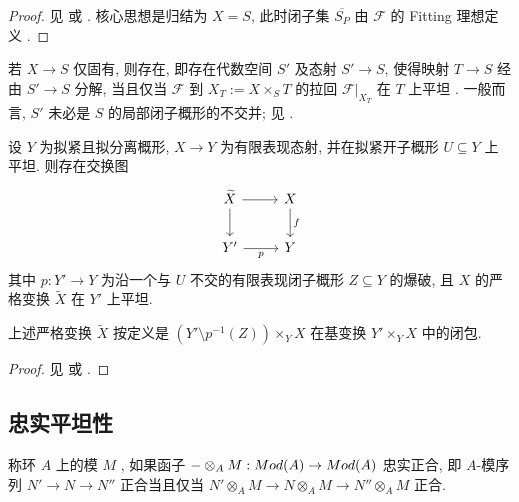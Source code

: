 \begin{proof}
见 \cite[引理 $3.3$]{FGAIV} 或 \cite[\S$8$]{Mum66a}. 核心思想是归结为 $X=S$, 此时闭子集 $\overline{S_P}$ 由 $\mathcal F$ 的 Fitting 理想定义 \cite[Tag 05P9]{SP}.
\end{proof}
\begin{remark}\label{src:A.2.17}
若 $X\to S$ 仅固有, 则存在, 即存在代数空间 $S'$ 及态射 $S'\to S$, 使得映射 $T\to S$ 经由 $S'\to S$ 分解, 当且仅当 $\mathcal F$ 到 $X_T:=X\times_S T$ 的拉回 $\mathcal F|_{X_T}$ 在 $T$ 上平坦 \cite[Tag 05UG]{SP}. 一般而言, $S'$ 未必是 $S$ 的局部闭子概形的不交并; 见 \cite{Kre13}.
\end{remark}
\begin{theorem}\label{src:A.2.18}
设 $Y$ 为拟紧且拟分离概形, $X\to Y$ 为有限表现态射, 并在拟紧开子概形 $U\subseteq Y$ 上平坦. 则存在交换图
\[
\begin{tikzcd}[column sep=2.5em,row sep=2em]
\widetilde X\arrow[r]\arrow[d]&X\arrow[d,"f"]\\
Y'\arrow[r,"p"']&Y
\end{tikzcd}
\]
其中 $p:Y'\to Y$ 为沿一个与 $U$ 不交的有限表现闭子概形 $Z\subseteq Y$ 的爆破, 且 $X$ 的严格变换 $\widetilde X$ 在 $Y'$ 上平坦.
\end{theorem}
上述严格变换 $\widetilde X$ 按定义是 $(Y'\setminus p^{-1}(Z))\times_Y X$ 在基变换 $Y'\times_Y X$ 中的闭包.
\begin{proof}
见 \cite[定理 I.$5.2.2$]{GR71} 或 \cite[Tag 0815]{SP}.
\end{proof}

\subsection{忠实平坦性}\label{src:A.2.3-subsection}
称环 $A$ 上的模 $M$ , 如果函子 $-\otimes_A M:Mod(A)\to Mod(A)$ 忠实正合, 即 $A$-模序列 $N'\to N\to N''$ 正合当且仅当 $N'\otimes_A M\to N\otimes_A M\to N''\otimes_A M$ 正合.

